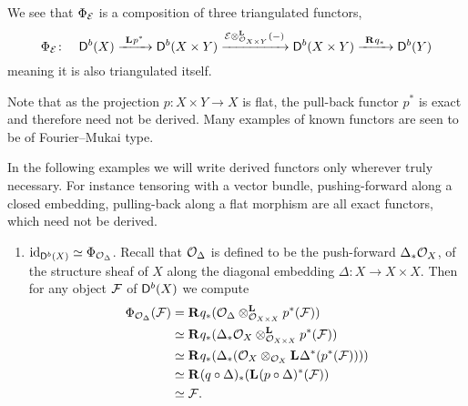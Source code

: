 \begin{remark}
    We see that $\fm{\E}$ is a composition of three triangulated functors,
    \[
        \fm{\E} \colon \quad \derb{X} \xrightarrow{\ \lderived{}{p^*} \ } \derb{X \times Y} \xrightarrow{\derivedtensor{\E}{(-)}{\struct{X \times Y}}} \derb{X \times Y} \xrightarrow{\ \rderived{}{q_*} \ } \derb{Y}
    \]
    meaning it is also triangulated itself.  
\end{remark}

Note that as the projection $p \colon X \times Y \to X$ is flat, the pull-back functor $p^*$ is exact and therefore need not be derived. Many examples of known functors are seen to be of Fourier--Mukai type.

\begin{example}
    \label{Identifying fm transforms}
    In the following examples we will write derived functors only wherever truly necessary. For instance tensoring with a vector bundle, pushing-forward along a closed embedding, pulling-back along a flat morphism are all exact functors, which need not be derived.
\begin{enumerate}[label = (\roman*)]
    \item{
    $\id{\derb{X}} \iso \fm{\struct{\Delta}}$. Recall that $\struct{\Delta}$ is defined to be the push-forward $\Delta_*\struct{X}$, of the structure sheaf of $X$ along the diagonal embedding $\Delta \colon X \to X \times X$. Then for any object $\F$ of $\derb{X}$ we compute 
    \begin{align*}
        \fm{\struct{\Delta}}(\F) &= \rderived{}{q_*}(\derivedtensor{\struct{\Delta}}{p^*(\F)}{\struct{X \times X}}) \\
        &\iso \rderived{}{q_*}(\derivedtensor{\Delta_*\struct{X}}{{p^*}(\F)}{\struct{X \times X}}) \\
        &\iso \rderived{}{q_*}(\Delta_*(\struct{X} \otimes_{\struct{X}}\lderived{}{\Delta^*}({p^*}(\F)))) \\
        &\iso \rderived{}{(q \circ \Delta)_*}(\lderived{}{(p \circ \Delta)^*}(\F)) \\
        &\iso \F.
    \end{align*}
}
\end{enumerate}
\end{example}
